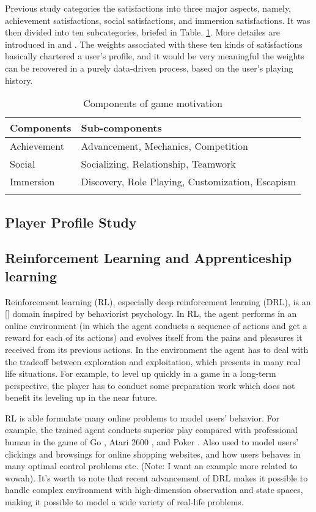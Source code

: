 \documentclass{sigchi}
\begin{document}
Previous study categories the satisfactions into three major aspects, namely, achievement satisfactions, social satisfactions, and immersion satisfactions. It was then divided into ten subcategories, briefed in Table. \ref{tbl:components}. More detailes are introduced in \cite{yee2006motivations} and \cite{yee2006demographics}. The weights associated with these ten kinds of satisfactions basically chartered a user's profile, and it would be very meaningful the weights can be recovered in a purely data-driven process, based on the user's playing history.

\begin{table}
\caption{Components of game motivation}
\begin{tabularx}{\textwidth}{lX}
    Components & Sub-components \\
    \midrule
    Achievement & Advancement, Mechanics, Competition \\
    Social & Socializing, Relationship, Teamwork \\
    Immersion & Discovery, Role Playing, Customization, Escapism \\
    \label{tbl:components}
\end{tabularx}
\end{table}

\subsection{Player Profile Study}



\subsection{Reinforcement Learning and Apprenticeship learning}

Reinforcement learning (RL), especially deep reinforcement learning (DRL), is an [] domain  inspired by behaviorist psychology. In RL, the agent performs in an online environment (in which the agent conducts a sequence of actions and get a reward for each of its actions) and evolves itself from the pains and pleasures it received from its previous actions. In the environment the agent has to deal with the tradeoff between exploration and exploitation, which presents in many real life situations. For example, to level up quickly in a game in a long-term perspective, the player has to conduct some preparation work which does not benefit its leveling up in the near future.

RL is able formulate many online problems to model users' behavior. For example, the trained agent conducts superior play compared with professional human in the game of Go \cite{silver2016mastering}, Atari 2600 \cite{mnih2015human}, and Poker \cite{heinrich2016deep}. Also used to model users' clickings and browsings for online shopping websites, and how users behaves in many optimal control problems etc. (Note: I want an example more related to wowah). It's worth to note that recent advancement of DRL makes it possible to handle complex environment with high-dimension observation and state spaces, making it possible to model a wide variety of real-life problems.
\end{document}
